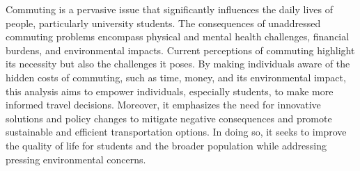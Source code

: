 Commuting is a pervasive issue that significantly influences the daily lives of people, particularly university
students.
The consequences of unaddressed commuting problems encompass physical and mental health challenges, financial burdens,
and environmental impacts.
Current perceptions of commuting highlight its necessity but also the challenges it poses.
By making individuals aware of the hidden costs of commuting, such as time, money, and its environmental impact, this
analysis aims to empower individuals, especially students, to make more informed travel decisions.
Moreover, it emphasizes the need for innovative solutions and policy changes to mitigate negative consequences and
promote sustainable and efficient transportation options.
In doing so, it seeks to improve the quality of life for students and the broader population while addressing pressing
environmental concerns.
